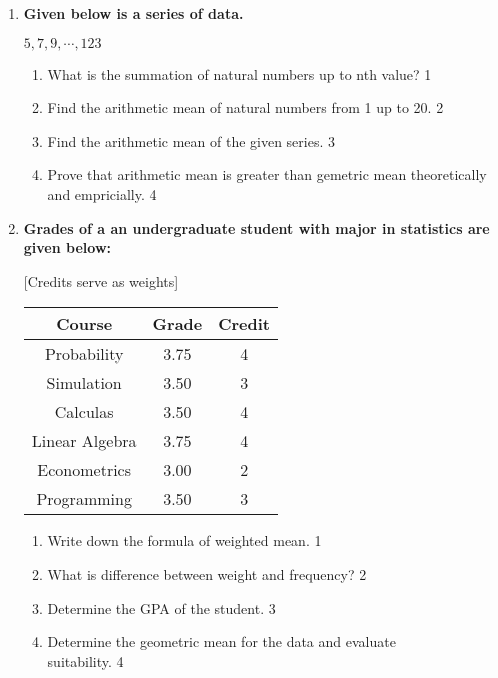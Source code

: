 \documentclass[a4paper,oneside]{book}
\begin{document}
\begin{enumerate}
   \item
	  \textbf{Given below is a series of data.} 
	  
	  	    \begin{center}
	 $5, 7, 9, \cdots , 123$
	    \end{center}
  
  \begin{enumerate}
    \item
	What is the summation of natural numbers up to nth value? \hfill 1
    \item
	Find the arithmetic mean of natural numbers from 1 up to 20. \hfill 2
    \item  
	Find the arithmetic mean of the given series. \hfill 3
    \item
	Prove that arithmetic mean is greater than gemetric mean theoretically and empricially. \hfill 4
  \end{enumerate}
  
   \item
	  \textbf{Grades of a an undergraduate student with major in statistics are given below: } 
	  
	  [Credits serve as weights]

\begin{table}[h]
\centering
\begin{tabular}{c|c|c}
\hline
Course & Grade & Credit \\ \hline
Probability & 3.75 & 4 \\ 
Simulation & 3.50 & 3 \\ 
Calculas & 3.50 & 4 \\ 
Linear Algebra & 3.75 & 4 \\ 
Econometrics & 3.00 & 2 \\ 
Programming & 3.50 & 3 \\ \hline
\end{tabular}
\end{table}

  
  \begin{enumerate}
    \item
	Write down the formula of weighted mean. \hfill 1
    \item
	What is difference between weight and frequency? \hfill 2
    \item  
	Determine the GPA of the student. \hfill 3
    \item
	Determine the geometric mean for the data and evaluate \\ suitability. \hfill 4
  \end{enumerate}


\end{enumerate}
\end{document}
